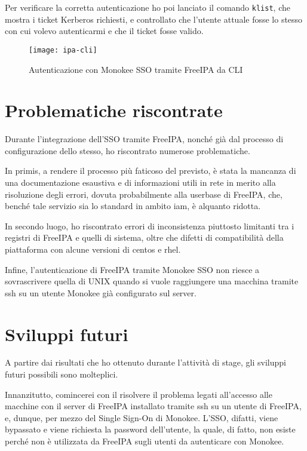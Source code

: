 Per verificare la corretta autenticazione ho poi lanciato il comando \texttt{klist}, che mostra i ticket Kerberos richiesti, e controllato che l'utente attuale fosse lo stesso con cui volevo autenticarmi e che il ticket fosse valido.  

\begin{figure}[!h] 
    \centering 
    \texttt{[image: ipa-cli]} 
    \caption{Autenticazione con Monokee SSO tramite FreeIPA da CLI}
    \label{fig:ipa-cli}
\end{figure}


\section{Problematiche riscontrate}

Durante l'integrazione dell'SSO tramite FreeIPA, nonché già dal processo di configurazione dello stesso, ho riscontrato numerose problematiche.

In primis, a rendere il processo più faticoso del previsto, è stata la mancanza di una  documentazione esaustiva e di informazioni utili in rete in merito alla risoluzione degli errori, dovuta probabilmente alla userbase di FreeIPA, che, benché tale servizio sia lo standard in ambito \acrshort{iam}, è alquanto ridotta.

In secondo luogo, ho riscontrato errori di inconsistenza piuttosto limitanti tra i registri di FreeIPA e quelli di sistema, oltre che difetti di compatibilità della piattaforma con alcune versioni di \acrshort{centos} e \acrshort{rhel}.

Infine, l'autenticazione di FreeIPA tramite Monokee SSO non riesce a sovrascrivere quella di UNIX quando si vuole raggiungere una macchina tramite \acrshort{ssh} su un utente Monokee già configurato sul server. 

\section{Sviluppi futuri}
A partire dai risultati che ho ottenuto durante l'attività di stage, gli sviluppi futuri possibili sono molteplici.

Innanzitutto, comincerei con il risolvere il problema legati all'accesso alle macchine con il server di FreeIPA installato tramite \acrshort{ssh} su un utente di FreeIPA, e, dunque, per mezzo del Single Sign-On di Monokee. L'SSO, difatti, viene bypassato e viene richiesta la password dell'utente, la quale, di fatto, non esiste perché non è utilizzata da FreeIPA sugli utenti da autenticare con Monokee. 

